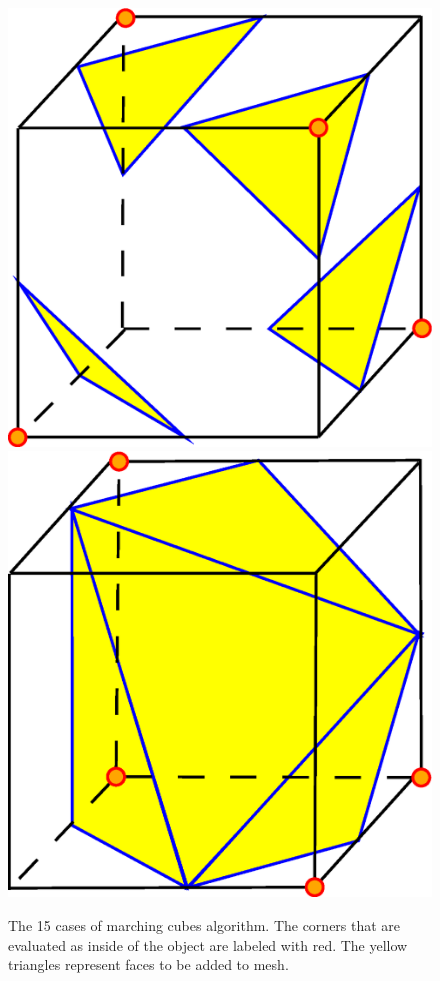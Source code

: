 \begin{figure}[ht]
\hspace{2mm}
\includegraphics[scale=0.15]{../img/mar_cub_case13.eps}
\hspace{3mm}
\includegraphics[scale=0.15]{../img/mar_cub_case14.eps}

\caption{The 15 cases of marching cubes algorithm. The corners that are evaluated as inside of the object
are labeled with red. The yellow triangles represent faces to be added to mesh.}
\label{fig:mc_cases}
\end{figure}

